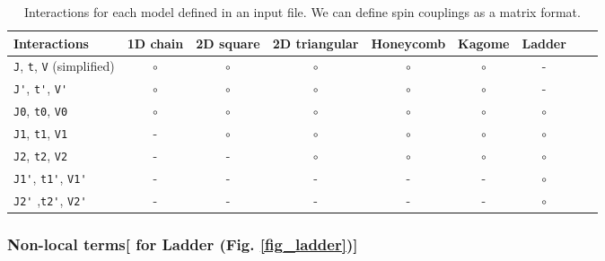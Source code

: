 \begin{table}[tbhp]
  \begin{tabular}{|l||c|c|c|c|c|c|c|c|} \hline
    Interactions & 1D chain & 2D square & 2D triangular & Honeycomb & Kagome & Ladder\\ 
    \hline 
    \hline
     \verb|J|, \verb|t|, \verb|V| (simplified) & $\circ$	 & $\circ$ & $\circ$ & $\circ$ & $\circ$ & -\\ 
     \hline
    \verb|J'|, \verb|t'|, \verb|V'| & $\circ$	 & $\circ$	& $\circ$ 	& $\circ$ 	& $\circ$ & - \\ 
    \hline
    \verb|J0|, \verb|t0|, \verb|V0| & $\circ$  & $\circ$ 	& $\circ$ 	& $\circ$ 	& $\circ$ & $\circ$\\ 
    \hline
    \verb|J1|, \verb|t1|, \verb|V1| & -         	 & $\circ$ 	& $\circ$ 	& $\circ$ 	& $\circ$ & $\circ$\\ 
    \hline
    \verb|J2|, \verb|t2|, \verb|V2|  & -         	 & -    	& $\circ$ 	& $\circ$ 	& $\circ$ & $\circ$\\
    \hline
    \verb|J1'|, \verb|t1'|, \verb|V1'| & -		 &-	 	& -		& -		& -		& $\circ$\\
    \hline
    \verb|J2'| ,\verb|t2'|, \verb|V2'|  & -		 &-	 	& -		& -		& -		& $\circ$\\ 
    \hline
\end{tabular}
   \caption{Interactions for each model defined in an input file. We can define spin couplings as a matrix format.}
    \label{table_interactions}
\end{table}

\subsubsection{Non-local terms[ for Ladder (Fig. \ref{fig_ladder})]}


